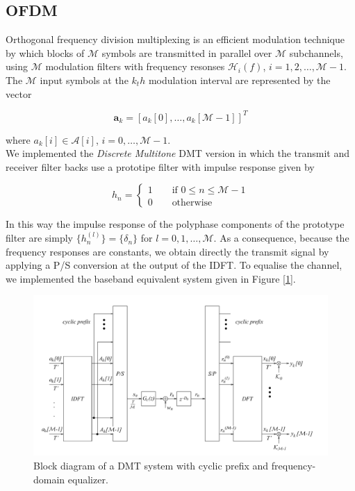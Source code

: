 \documentclass[a4paper, 12pt]{report}
\begin{document}
\clearpage
\subsection*{OFDM}
Orthogonal frequency division multiplexing is an efficient modulation technique by which blocks of $\mathcal{M}$ symbols are transmitted in parallel over $\mathcal{M}$ subchannels, using $\mathcal{M}$ modulation filters with frequency resonses $\mathcal{H}_i(f)$, $i=1,2,\dots,\mathcal{M}-1$. The $\mathcal{M}$ input symbols at the $k_th$ modulation interval are represented by the vector

\begin{equation}
\mathbf{a}_k = [a_k[0],\dots,a_k[\mathcal{M}-1]]^T
\end{equation}

where $a_k[i]\in\mathcal{A}[i]$, $i=0,\dots,\mathcal{M}-1$.\\
We implemented the \textit{Discrete Multitone} DMT version in which the transmit and receiver filter backs use a prototipe filter with impulse response given by

\begin{equation}
h_n = \begin{cases}
		1 \quad\quad \text{if } 0\le n\le\mathcal{M}-1 \\
		0 \quad\quad \text{otherwise}
\end{cases}
\end{equation}

In this way the impulse response of the polyphase components of the prototype filter are simply $\{ h_n^(l)\}=\{\delta_n\}$ for $l=0,1,\dots,\mathcal{M}$. As a consequence, because the frequency responses are constants, we obtain directly the transmit signal by applying a P/S conversion at the output of the IDFT. To equalise the channel, we implemented the baseband equivalent system given in Figure [\ref{ofdm}].

\begin{figure}[H]
	\centering
	\includegraphics[width=14cm]{OFDM}
	\caption{Block diagram of a DMT system with cyclic prefix and frequency-domain equalizer.}\label{ofdm}
\end{figure}
\end{document}
